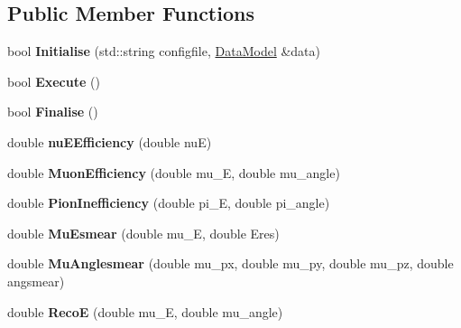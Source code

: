 \subsection*{Public Member Functions}
\begin{DoxyCompactItemize}
\item 
\hypertarget{classNeutronStudyPMCS_a044b07d39e07fbac5764b8788f11a3ec}{bool {\bfseries Initialise} (std\-::string configfile, \hyperlink{classDataModel}{Data\-Model} \&data)}\label{classNeutronStudyPMCS_a044b07d39e07fbac5764b8788f11a3ec}

\item 
\hypertarget{classNeutronStudyPMCS_a1cc06822548c3febc0708db5b59c343b}{bool {\bfseries Execute} ()}\label{classNeutronStudyPMCS_a1cc06822548c3febc0708db5b59c343b}

\item 
\hypertarget{classNeutronStudyPMCS_aa4e1c744c42f16c63b4ddefefda81922}{bool {\bfseries Finalise} ()}\label{classNeutronStudyPMCS_aa4e1c744c42f16c63b4ddefefda81922}

\item 
\hypertarget{classNeutronStudyPMCS_acdaa5568f44221b53168e490969393bf}{double {\bfseries nu\-E\-Efficiency} (double nu\-E)}\label{classNeutronStudyPMCS_acdaa5568f44221b53168e490969393bf}

\item 
\hypertarget{classNeutronStudyPMCS_aefc2ab996c1c513c0f032931f3f67e7e}{double {\bfseries Muon\-Efficiency} (double mu\-\_\-\-E, double mu\-\_\-angle)}\label{classNeutronStudyPMCS_aefc2ab996c1c513c0f032931f3f67e7e}

\item 
\hypertarget{classNeutronStudyPMCS_ad0cfe53c957f4a47fbe60f7bc390e32b}{double {\bfseries Pion\-Inefficiency} (double pi\-\_\-\-E, double pi\-\_\-angle)}\label{classNeutronStudyPMCS_ad0cfe53c957f4a47fbe60f7bc390e32b}

\item 
\hypertarget{classNeutronStudyPMCS_aa55a9508e67f6c758b1e7ecb7ff87a74}{double {\bfseries Mu\-Esmear} (double mu\-\_\-\-E, double Eres)}\label{classNeutronStudyPMCS_aa55a9508e67f6c758b1e7ecb7ff87a74}

\item 
\hypertarget{classNeutronStudyPMCS_ad04d525456090178ee877757d120993a}{double {\bfseries Mu\-Anglesmear} (double mu\-\_\-px, double mu\-\_\-py, double mu\-\_\-pz, double angsmear)}\label{classNeutronStudyPMCS_ad04d525456090178ee877757d120993a}

\item 
\hypertarget{classNeutronStudyPMCS_a87bfadcdde1434cd4aaa66ff9968a121}{double {\bfseries Reco\-E} (double mu\-\_\-\-E, double mu\-\_\-angle)}\label{classNeutronStudyPMCS_a87bfadcdde1434cd4aaa66ff9968a121}


\end{DoxyCompactItemize}
